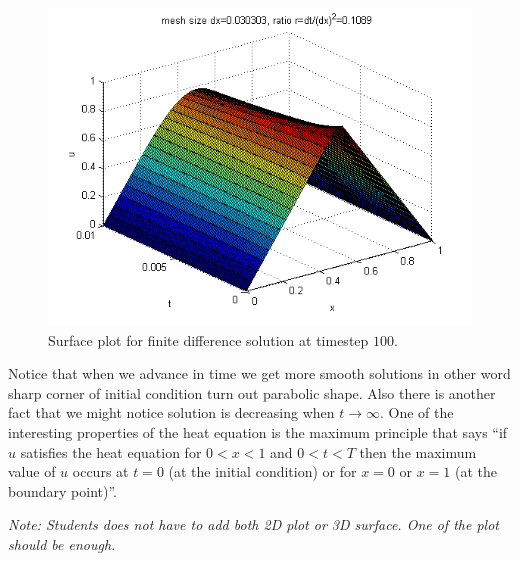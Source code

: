 \begin{solution}
\begin{enumerate}
\begin{figure}
\centering
\includegraphics[width=.8\textwidth]{p4a_surf100.png}
\caption{Surface plot for finite difference solution  at timestep $100$.}
\end{figure}

Notice that when we advance in time we get more smooth solutions in other word sharp corner of initial condition turn out parabolic shape. Also there is another fact that we might notice solution is decreasing when $t \rightarrow \infty$. One of the interesting properties of the heat equation is the maximum principle that says ``if $u$ satisfies the heat equation for $0 < x <1$ and $0 < t < T$ then the maximum value of $u$ occurs at $t = 0$ (at the initial
condition) or for $x = 0$ or $x = 1$ (at the boundary point)''. 

\emph{Note: Students does not have to add both 2D plot or 3D surface. One of the plot should be enough.}
 \end{enumerate}
\end{solution}